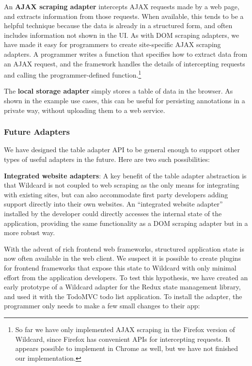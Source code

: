 \documentclass[sigplan,screen,10pt,anonymous,review]{acmart}
\begin{document}
An \textbf{AJAX scraping adapter} intercepts AJAX requests made by a web
page, and extracts information from those requests. When available, this
tends to be a helpful technique because the data is already in a
structured form, and often includes information not shown in the UI. As
with DOM scraping adapters, we have made it easy for programmers to
create site-specific AJAX scraping adapters. A programmer writes a
function that specifies how to extract data from an AJAX request, and
the framework handles the details of intercepting requests and calling
the programmer-defined function.\footnote{So far we have only
  implemented AJAX scraping in the Firefox version of Wildcard, since
  Firefox has convenient APIs for intercepting requests. It appears
  possible to implement in Chrome as well, but we have not finished our
  implementation.}

The \textbf{local storage adapter} simply stores a table of data in the
browser. As shown in the example use cases, this can be useful for
persisting annotations in a private way, without uploading them to a web
service.

\hypertarget{future-adapters}{%
\subsubsection{Future Adapters}\label{future-adapters}}

We have designed the table adapter API to be general enough to support
other types of useful adapters in the future. Here are two such
possibilities:

\textbf{Integrated website adapters}: A key benefit of the table adapter
abstraction is that Wildcard is not coupled to web scraping as the only
means for integrating with existing sites, but can also accommodate
first party developers adding support directly into their own websites.
An ``integrated website adapter'' installed by the developer could
directly accesses the internal state of the application, providing the
same functionality as a DOM scraping adapter but in a more robust way.

With the advent of rich frontend web frameworks, structured application
state is now often available in the web client. We suspect it is
possible to create plugins for frontend frameworks that expose this
state to Wildcard with only minimal effort from the application
developers. To test this hypothesis, we have created an early prototype
of a Wildcard adapter for the Redux state management library, and used
it with the TodoMVC todo list application. To install the adapter, the
programmer only needs to make a few small changes to their app:
\end{document}
